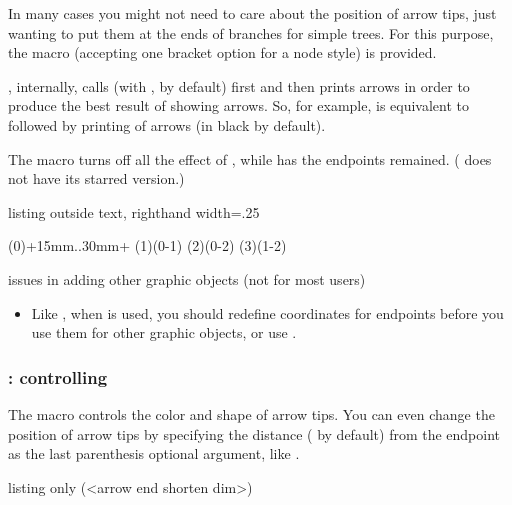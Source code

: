 In many cases you might not need to care about the position of arrow tips, just wanting to put them at the ends of branches for simple trees. For this purpose, the macro \cmd{\xtShowArrows} (accepting one bracket option for a node style) is provided.

\icmd{\xtShowArrows}, internally, calls \cmd{\xtShowEndPoints} (with , by default) first and then prints arrows in order to produce the best result of showing arrows.
So, for example,  is equivalent to  followed by printing of arrows (in black by default).

The macro \icmd{\xtHideArrows} turns off all the effect of \cmd{\xtShowArrows}, while \icmd{\xtHideArrows*} has the  endpoints remained. (\cmd{\xtShowArrows} does not have its starred version.)

\begin{tcblisting}{listing outside text, righthand width=.25\linewidth}
\begin{istgame}
\xtShowArrows
\istroot(0)+15mm..30mm+  \istb[blue] \istb[red] \endist
\xtHideArrows
\istroot(1)(0-1)   \istb \endist
\xtHideArrows* %
\istroot(2)(0-2)   \istb \endist
{}
\istroot(3)(1-2)   \istb \endist
\end{istgame}
\end{tcblisting}

\remark issues in adding other graphic objects (not for most users)
\begin{itemize}\tightlist
\item Like \cmd{\xtShowMidArrows}, when \cmd{\xtShowArrows} is used, you should redefine coordinates for endpoints before you use them for other graphic objects, or use .
\end{itemize}


\subsubsection{\protect\cmd{\setxtshowarrows}: controlling \protect\cmd{\xtShowArrows}}

The macro \icmd{\setxtshowarrows} controls the color and shape of arrow tips.
You can even change the position of arrow tips by specifying the distance (\xw{1.2pt} by default) from the endpoint as the last parenthesis optional argument, like \xw{(5pt)}.

\begin{tcblisting}{listing only}
  (<arrow end shorten dim>)
\end{tcblisting}

